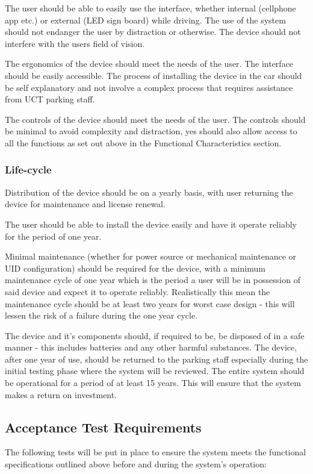 The user should be able to easily use the interface, whether internal (cellphone app etc.) or external (LED sign board) while driving. The use of the system should not endanger the user by distraction or otherwise. The device should not interfere with the users field of vision.

The ergonomics of the device should meet the needs of the user. The interface should be easily accessible. The process of installing the device in the car should be self explanatory and not involve a complex process that requires assistance from UCT parking staff.

\newpage
{}
The controls of the device should meet the needs of the user. The controls should be minimal to avoid complexity and distraction, yes should also allow access to all the functions as set out above in the Functional Characteristics section.

\subsubsection{Life-cycle}
Distribution of the device should be on a yearly basis, with user returning the device for maintenance and license renewal.

The user should be able to install the device easily and have it operate reliably for the period of one year. 

Minimal maintenance (whether for power source or mechanical maintenance or UID configuration) should be required for the device, with a minimum maintenance cycle of one year which is the period a user will be in possession of said device and expect it to operate reliably. Realistically this mean the maintenance cycle should be at least two years for worst case design - this will lessen the risk of a failure during the one year cycle.

The device and it's components should, if required to be, be disposed of in a safe manner - this includes batteries and any other harmful substances. The device, after one year of use, should be returned to the parking staff especially during the initial testing phase where the system will be reviewed. The entire system should be operational for a period of at least 15 years. This will ensure that the system makes a return on investment.

\subsection{Acceptance Test Requirements}
The following tests will be put in place to ensure the system meets the functional specifications outlined above before and during the system's operation:

